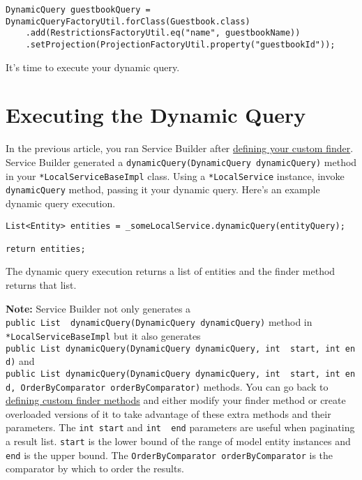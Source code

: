 \begin{verbatim}
DynamicQuery guestbookQuery = DynamicQueryFactoryUtil.forClass(Guestbook.class)
    .add(RestrictionsFactoryUtil.eq("name", guestbookName))
    .setProjection(ProjectionFactoryUtil.property("guestbookId"));
\end{verbatim}

It's time to execute your dynamic query.

\section{Executing the Dynamic Query}\label{executing-the-dynamic-query}

In the previous article, you ran Service Builder after
\href{/docs/7-2/appdev/-/knowledge_base/a/defining-a-custom-finder-method}{defining
your custom finder}. Service Builder generated a
\texttt{dynamicQuery(DynamicQuery\ dynamicQuery)} method in your
\texttt{*LocalServiceBaseImpl} class. Using a \texttt{*LocalService}
instance, invoke \texttt{dynamicQuery} method, passing it your dynamic
query. Here's an example dynamic query execution.

\begin{verbatim}
List<Entity> entities = _someLocalService.dynamicQuery(entityQuery);

return entities;
\end{verbatim}

The dynamic query execution returns a list of entities and the finder
method returns that list.

\noindent\hrulefill

\textbf{Note:} Service Builder not only generates a
\texttt{public\ List\ \ dynamicQuery(DynamicQuery\ dynamicQuery)} method
in \texttt{*LocalServiceBaseImpl} but it also generates
\texttt{public\ List\ dynamicQuery(DynamicQuery\ dynamicQuery,\ int\ \ start,\ int\ end)}
and
\texttt{public\ List\ dynamicQuery(DynamicQuery\ dynamicQuery,\ int\ \ start,\ int\ end,\ OrderByComparator\ orderByComparator)}
methods. You can go back to
\href{/docs/7-2/appdev/-/knowledge_base/a/defining-a-custom-finder-method}{defining
custom finder methods} and either modify your finder method or create
overloaded versions of it to take advantage of these extra methods and
their parameters. The \texttt{int\ start} and \texttt{int\ \ end}
parameters are useful when paginating a result list. \texttt{start} is
the lower bound of the range of model entity instances and \texttt{end}
is the upper bound. The \texttt{OrderByComparator\ orderByComparator} is
the comparator by which to order the results.

